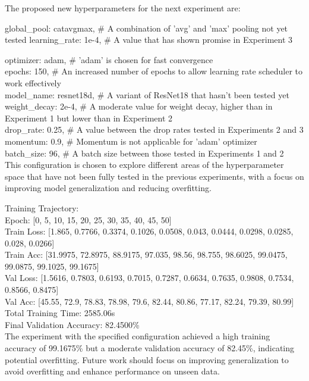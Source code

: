 \documentclass{article}
\begin{document}
\begin{tcolorbox}[enhanced jigsaw,breakable,pad at break*=1mm,
  colback=blue!5!white,colframe=blue!75!black,title=GPT-4 Experimental Logs,
  watermark color=white]
The proposed new hyperparameters for the next experiment are:

global\_pool: catavgmax,  \# A combination of 'avg' and 'max' pooling not yet tested 
learning\_rate: 1e-4,       \# A value that has shown promise in Experiment 3 

optimizer: adam,         \# 'adam' is chosen for fast convergence \\
epochs: 150,               \# An increased number of epochs to allow learning rate scheduler to work effectively \\
model\_name: resnet18d,   \# A variant of ResNet18 that hasn't been tested yet \\
weight\_decay: 2e-4,        \# A moderate value for weight decay, higher than in Experiment 1 but lower than in Experiment 2 \\
drop\_rate: 0.25,           \# A value between the drop rates tested in Experiments 2 and 3 \\
momentum: 0.9,             \# Momentum is not applicable for 'adam' optimizer \\
batch\_size: 96,            \# A batch size between those tested in Experiments 1 and 2 \\


This configuration is chosen to explore different areas of the hyperparameter space that have not been fully tested in the previous experiments, with a focus on improving model generalization and reducing overfitting.


Training Trajectory: \\
Epoch: [0, 5, 10, 15, 20, 25, 30, 35, 40, 45, 50] \\
Train Loss: [1.865, 0.7766, 0.3374, 0.1026, 0.0508, 0.043, 0.0444, 0.0298, 0.0285, 0.028, 0.0266] \\
Train Acc: [31.9975, 72.8975, 88.9175, 97.035, 98.56, 98.755, 98.6025, 99.0475, 99.0875, 99.1025, 99.1675] \\
Val Loss: [1.5616, 0.7803, 0.6193, 0.7015, 0.7287, 0.6634, 0.7635, 0.9808, 0.7534, 0.8566, 0.8475] \\
Val Acc: [45.55, 72.9, 78.83, 78.98, 79.6, 82.44, 80.86, 77.17, 82.24, 79.39, 80.99] \\
Total Training Time: 2585.06s \\
Final Validation Accuracy: 82.4500\% \\
The experiment with the specified configuration achieved a high training accuracy of 99.1675\% but a moderate validation accuracy of 82.45\%, indicating potential overfitting. Future work should focus on improving generalization to avoid overfitting and enhance performance on unseen data.



\end{tcolorbox}
\end{document}
